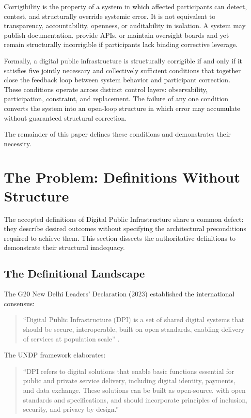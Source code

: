 \documentclass{article}
\begin{document}
Corrigibility is the property of a system in which affected participants can detect, contest, and structurally override systemic error. It is not equivalent to transparency, accountability, openness, or auditability in isolation. A system may publish documentation, provide APIs, or maintain oversight boards and yet remain structurally incorrigible if participants lack binding corrective leverage.

Formally, a digital public infrastructure is structurally corrigible if and only if it satisfies five jointly necessary and collectively sufficient conditions that together close the feedback loop between system behavior and participant correction. These conditions operate across distinct control layers: observability, participation, constraint, and replacement. The failure of any one condition converts the system into an open-loop structure in which error may accumulate without guaranteed structural correction.

The remainder of this paper defines these conditions and demonstrates their necessity.

\section{The Problem: Definitions Without Structure}
\label{sec:problem}

The accepted definitions of Digital Public Infrastructure share a common defect: they describe desired outcomes without specifying the architectural preconditions required to achieve them. This section dissects the authoritative definitions to demonstrate their structural inadequacy.

\subsection{The Definitional Landscape}

The G20 New Delhi Leaders' Declaration (2023) established the international consensus:

\begin{quote}
``Digital Public Infrastructure (DPI) is a set of shared digital systems that should be secure, interoperable, built on open standards, enabling delivery of services at population scale'' \citep{g20}.
\end{quote}

The UNDP framework \citep{undp} elaborates:

\begin{quote}
``DPI refers to digital solutions that enable basic functions essential for public and private service delivery, including digital identity, payments, and data exchange. These solutions can be built as open-source, with open standards and specifications, and should incorporate principles of inclusion, security, and privacy by design.''
\end{quote}
\end{document}
